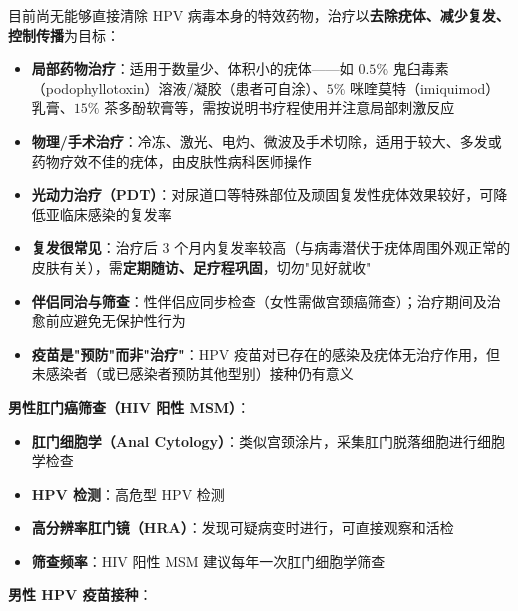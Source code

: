 目前尚无能够直接清除 HPV 病毒本身的特效药物，治疗以\textbf{去除疣体、减少复发、控制传播}为目标：

\begin{itemize}
	\item \textbf{局部药物治疗}：适用于数量少、体积小的疣体——如 $0.5\%$ 鬼臼毒素（podophyllotoxin）溶液/凝胶（患者可自涂）、$5\%$ 咪喹莫特（imiquimod）乳膏、$15\%$ 茶多酚软膏等，需按说明书疗程使用并注意局部刺激反应
	\item \textbf{物理/手术治疗}：冷冻、激光、电灼、微波及手术切除，适用于较大、多发或药物疗效不佳的疣体，由皮肤性病科医师操作
	\item \textbf{光动力治疗（PDT）}：对尿道口等特殊部位及顽固复发性疣体效果较好，可降低亚临床感染的复发率
	\item \textbf{复发很常见}：治疗后 $3$ 个月内复发率较高（与病毒潜伏于疣体周围外观正常的皮肤有关），需\textbf{定期随访、足疗程巩固}，切勿"见好就收"
	\item \textbf{伴侣同治与筛查}：性伴侣应同步检查（女性需做宫颈癌筛查）；治疗期间及治愈前应避免无保护性行为
	\item \textbf{疫苗是"预防"而非"治疗"}：HPV 疫苗对已存在的感染及疣体无治疗作用，但未感染者（或已感染者预防其他型别）接种仍有意义
\end{itemize}

\vspace{0.5em}
\noindent\textbf{男性肛门癌筛查（HIV 阳性 MSM）}：

\begin{itemize}[leftmargin=2cm]
	\item \textbf{肛门细胞学（Anal Cytology）}：类似宫颈涂片，采集肛门脱落细胞进行细胞学检查
	\item \textbf{HPV 检测}：高危型 HPV 检测
	\item \textbf{高分辨率肛门镜（HRA）}：发现可疑病变时进行，可直接观察和活检
	\item \textbf{筛查频率}：HIV 阳性 MSM 建议每年一次肛门细胞学筛查
\end{itemize}

\vspace{0.5em}
\noindent\textbf{男性 HPV 疫苗接种}：

